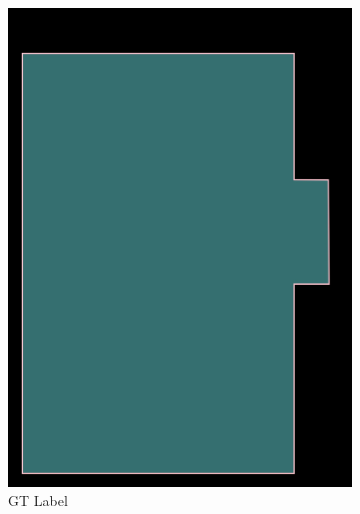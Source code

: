 \documentclass[aspectratio=1610]{beamer}
\begin{document}
\begin{frame}
\begin{figure}
\begin{subfigure}{.25\textwidth}
  \includegraphics[width=0.99\linewidth, clip=true, trim = 0mm 0mm 0mm 0mm]{figures/bbox/FZKQ4Zg.jpg}
  \caption{GT Label}
\end{subfigure}%
\begin{subfigure}{.25\textwidth}
  \centering

\end{subfigure}
\end{figure}
\end{frame}
\end{document}
